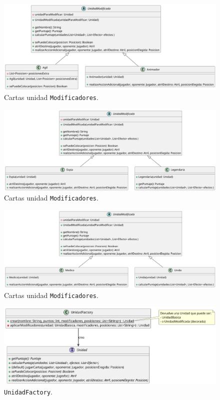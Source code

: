 \documentclass[titlepage,a4paper]{article}
\begin{document}
	\begin{figure}[H]
		\centering
		\includegraphics[width=1\textwidth]{diagramas/clases/Modificadores1}
		\caption{\label{fig:class081}Cartas unidad \texttt{Modificadores}.}
	\end{figure}

	\begin{figure}[H]
		\centering
		\includegraphics[width=1\textwidth]{diagramas/clases/Modificadores2}
		\caption{\label{fig:class082}Cartas unidad \texttt{Modificadores}.}
	\end{figure}

	\begin{figure}[H]
		\centering
		\includegraphics[width=1\textwidth]{diagramas/clases/Modificadores3}
		\caption{\label{fig:class083}Cartas unidad \texttt{Modificadores}.}
	\end{figure}

	\begin{figure}[H]
		\centering
		\includegraphics[width=1\textwidth]{diagramas/clases/UnidadFactory}
		\caption{\label{fig:class09} \texttt{UnidadFactory}.}
	\end{figure}
\end{document}
